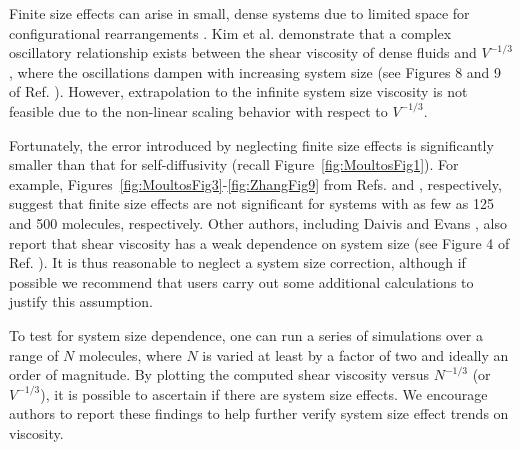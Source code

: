\documentclass[9pt,bestpractices]{livecoms}
\begin{document}
Finite size effects can arise in small, dense systems due to limited space for configurational rearrangements \cite{Kim2018}. Kim et al. \cite{Kim2018} demonstrate that a complex oscillatory relationship exists between the shear viscosity of dense fluids and $V^{-1/3}$, where the oscillations dampen with increasing system size (see Figures 8 and 9 of Ref. \cite{Kim2018}). However, extrapolation to the infinite system size viscosity is not feasible due to the non-linear scaling behavior with respect to $V^{-1/3}$. 

Fortunately, the error introduced by neglecting finite size effects is significantly smaller than that for self-diffusivity (recall Figure~\ref{fig:MoultosFig1}). For example, Figures~\ref{fig:MoultosFig3}-\ref{fig:ZhangFig9} from Refs. \cite{Moultos2016} and \cite{Zhang2015}, respectively, suggest that finite size effects are not significant for systems with as few as 125 and 500 molecules, respectively. Other authors, including Daivis and Evans \cite{Daivis:1995}, also report that shear viscosity has a weak dependence on system size (see Figure 4 of Ref. \cite{Daivis:1995}). It is thus reasonable to neglect a system size correction, although if possible we recommend that users carry out some additional calculations to justify this assumption.



To test for system size dependence, one can run a series of simulations over a range of $N$ molecules, where $N$ is varied at least by a factor of two and ideally an order of magnitude. By plotting the computed shear viscosity versus $N^{-1/3}$ (or $V^{-1/3}$), it is possible to ascertain if there are system size effects. We encourage authors to report these findings to help further verify system size effect trends on viscosity. 

\end{document}
